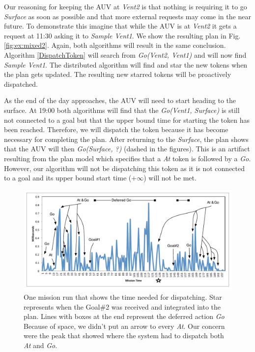 Our reasoning for keeping the AUV at {\em Vent2} is that
nothing is requiring it to go {\em Surface} as soon as possible and that
more external requests may come in the near future. To demonstrate
this imagine that while the AUV is at {\em Vent2} it gets a
request at 11:30 asking it to {\em Sample Vent1}.  We show the resulting plan in
Fig. \ref{fig:ex:mixed2}. Again, both algorithms will result in the
same conclusion. Algorithm \ref{DispatchToken} will search from {\em
Go(Vent2, Vent1)} and will now find {\em Sample Vent1}. The
distributed algorithm will find and star the new tokens when the plan
gets updated. The resulting new starred tokens will be proactively
dispatched.

As the end of the day approaches, the AUV will need to start heading
to the surface. At 19:00 both algorithms will find that the {\em Go(Vent1,
Surface)} is still not connected to a goal but that the upper bound time
for starting the token has been reached. Therefore, we will dispatch
the token because it has become necessary for completing the plan.
After returning to the {\em Surface}, the plan shows that the AUV will then {\em
Go(Surface, ?)} (dashed in the figures). This is an artifact resulting
from the plan model which specifies that a {\em At} token is followed by a {\em Go}. 
However, our algorithm will not be dispatching this token as 
it is not connected to a goal and its upper bound start time
($+\infty$) will not be met.

\begin{figure}
\centering
\includegraphics[width=\columnwidth]{figs/example_run.pdf}
\caption{\small  One mission run that shows the time needed for dispatching. Star represents when the Goal\#2 was
received and integrated into the plan. Lines with boxes at the end represent the deferred action {\em Go} Because of space,
we didn't put an arrow to every {\em At}. Our concern were the peak that showed where the system had to dispatch both {\em At} and {\em Go}. } 
  \label{fig:example_run}
\end{figure}

